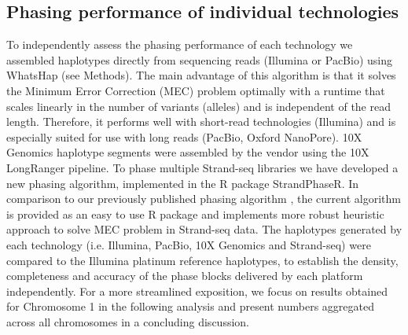 \subsection{Phasing performance of individual technologies}
	To independently assess the phasing performance of each technology we assembled haplotypes directly from sequencing reads (Illumina or PacBio) using WhatsHap (see Methods). 
	The main advantage of this algorithm is that it solves the Minimum Error Correction (MEC) problem optimally with a runtime that scales linearly in the number of variants (alleles) and is independent of the read length. 
	Therefore, it performs well with short-read technologies (Illumina) and is especially suited for use with long reads (PacBio, Oxford NanoPore). 10X Genomics haplotype segments were assembled by the vendor using the 10X LongRanger pipeline. 
	To phase multiple Strand-seq libraries we have developed a new phasing algorithm, implemented in the R package StrandPhaseR.
	In comparison to our previously published phasing algorithm \citep{porubsky2016direct}, the current algorithm is provided as an easy to use R package and implements more robust heuristic approach to solve MEC problem in Strand-seq data.
	The haplotypes generated by each technology (i.e. Illumina, PacBio, 10X Genomics and Strand-seq) were compared to the Illumina platinum reference haplotypes, to establish the density, completeness and accuracy of the phase blocks delivered by each platform independently. 
	For a more streamlined exposition, we focus on results obtained for Chromosome 1 in the following analysis and present numbers aggregated across all chromosomes in a concluding discussion.	
	
